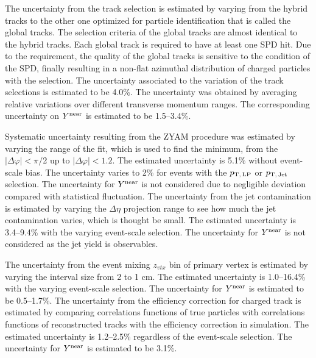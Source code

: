 The uncertainty from the track selection is estimated by varying from the hybrid tracks to the other one optimized for particle identification that is called the global tracks. The selection criteria of the global tracks are almost identical to the hybrid tracks. Each global track is required to have at least one SPD hit. 
Due to the requirement, the quality of the global tracks is sensitive to the condition of the SPD, finally resulting in a non-flat azimuthal distribution of charged particles with the selection. 
The uncertainty associated to the variation of the track selections is estimated to be 4.0\%. The uncertainty was obtained by averaging relative variations over different transverse momentum ranges. The corresponding uncertainty on $Y^{\rm{near}}$ is estimated to be 1.5--3.4\%.

Systematic uncertainty resulting from the ZYAM procedure was estimated by varying the range of the fit, which is used to find the minimum, from the $|\Delta\varphi|<\pi/$2 up to $|\Delta\varphi|<1.2$. The estimated uncertainty is 5.1\% without event-scale bias. The uncertainty varies to 2\% for events with the $p_\mathrm{T,\,LP}$ or $p_\mathrm{T,\,Jet}$ selection. The uncertainty for $Y^{\rm{near}}$ is not considered due to negligible deviation compared with statistical fluctuation. The uncertainty from the jet contamination is estimated by varying the $\Delta\eta$ projection range to see how much the jet contamination varies, which is thought be small. The estimated uncertainty is 3.4--9.4\% with the varying event-scale selection. The uncertainty for $Y^{\rm{near}}$ is not considered as the jet yield is observables.

The uncertainty from the event mixing $z_{vtx}$ bin of primary vertex is estimated by varying the interval size from 2 to 1 cm. The estimated uncertainty is 1.0--16.4\% with the varying event-scale selection. The uncertainty for $Y^{\rm{near}}$ is estimated to be 0.5--1.7\%. The uncertainty from the efficiency correction for charged track is estimated by comparing correlations functions of true particles with correlations functions of reconstructed tracks with the efficiency correction in simulation. The estimated uncertainty is 1.2--2.5\% regardless of the event-scale selection. The uncertainty for $Y^{\rm{near}}$ is estimated to be 3.1\%.

